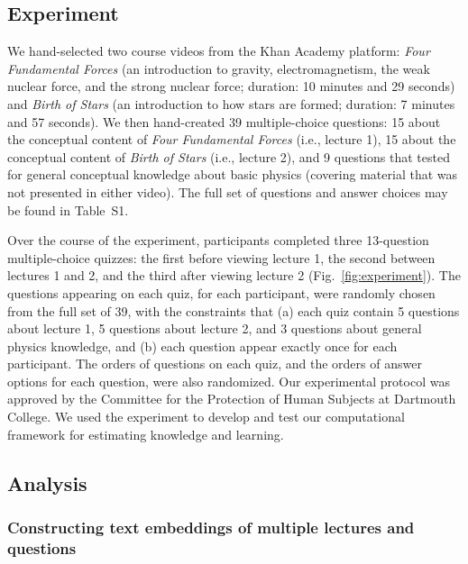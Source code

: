 \documentclass[10pt]{article}
\newcommand{\questions}{S1}
\begin{document}
\subsection*{Experiment}\label{subsec:experiment}

We hand-selected two course videos from the Khan Academy platform: \textit{Four
Fundamental Forces} (an introduction to gravity, electromagnetism, the weak
nuclear force, and the strong nuclear force; duration: 10 minutes and 29
seconds) and \textit{Birth of Stars} (an introduction to how stars are formed;
duration: 7 minutes and 57 seconds). We then hand-created 39 multiple-choice
questions: 15 about the conceptual content of \textit{Four Fundamental Forces} (i.e., lecture 1),
15 about the conceptual content of \textit{Birth of Stars} (i.e., lecture 2), and 9
questions that tested for general conceptual knowledge about basic physics
(covering material that was not presented in either video). The full set of
questions and answer choices may be found in Table~\questions.

Over the course of the experiment, participants completed three 13-question
multiple-choice quizzes: the first before viewing lecture 1, the second between
lectures 1 and 2, and the third after viewing lecture 2
(Fig.~\ref{fig:experiment}). The questions appearing on each quiz, for each
participant, were randomly chosen from the full set of 39, with the constraints
that (a) each quiz contain 5 questions about lecture 1, 5 questions about
lecture 2, and 3 questions about general physics knowledge, and (b) each
question appear exactly once for each participant. The orders of questions on
each quiz, and the orders of answer options for each question, were also
randomized. Our experimental protocol was approved by the Committee for the
Protection of Human Subjects at Dartmouth College. We used the experiment to
develop and test our computational framework for estimating knowledge and
learning.

\subsection*{Analysis}

\subsubsection*{Constructing text embeddings of multiple lectures and questions}\label{subsec:topic-modeling}
\end{document}
